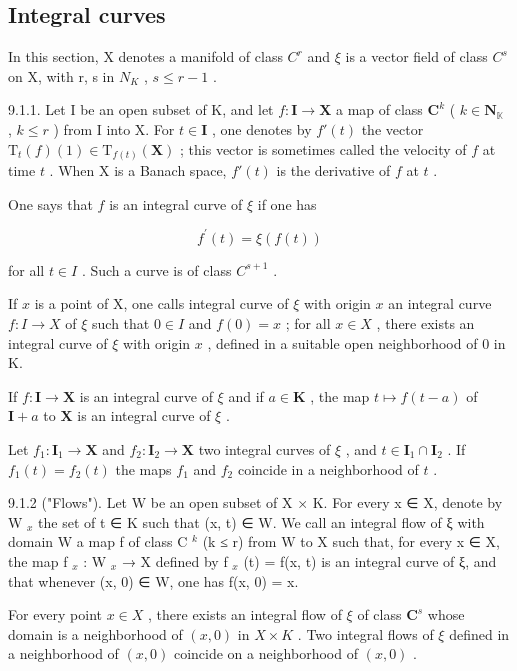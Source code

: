 \subsection{Integral curves}

In this section, X denotes a manifold of class \(C^{r}\) and \(\xi\) is a vector field of class \(C^{s}\) on X, with r, s in \(N_{K}\) , \(s \leqslant r - 1\) .

9.1.1. Let I be an open subset of K, and let \(f: \mathbf{I} \to \mathbf{X}\) a map of class \(\mathbf{C}^k\) ( \(k \in \mathbf{N}_{\mathbb{K}}\) , \(k \leqslant r\) ) from I into X. For \(t \in \mathbf{I}\) , one denotes by \(f'(t)\) the vector \(\mathrm{T}_t(f)(1) \in \mathrm{T}_{f(t)}(\mathbf{X})\) ; this vector is sometimes called the velocity of \(f\) at time \(t\) . When X is a Banach space, \(f'(t)\) is the derivative of \(f\) at \(t\) .

One says that \(f\) is an integral curve of \(\xi\) if one has

\[
f ^ {\prime} (t) = \xi (f (t))\tag{1}
\]

for all \(t \in I\) . Such a curve is of class \(C^{s+1}\) .

If \(x\) is a point of X, one calls integral curve of \(\xi\) with origin \(x\) an integral curve \(f: I \to X\) of \(\xi\) such that \(0 \in I\) and \(f(0) = x\) ; for all \(x \in X\) , there exists an integral curve of \(\xi\) with origin \(x\) , defined in a suitable open neighborhood of 0 in K.

If \(f: \mathbf{I} \to \mathbf{X}\) is an integral curve of \(\xi\) and if \(a \in \mathbf{K}\) , the map \(t \mapsto f(t - a)\) of \(\mathbf{I} + a\) to \(\mathbf{X}\) is an integral curve of \(\xi\) .

Let \(f_{1}\colon\mathbf{I}_{1}\to\mathbf{X}\) and \(f_{2}\colon\mathbf{I}_{2}\to\mathbf{X}\) two integral curves of \(\xi\) , and \(t\in\mathbf{I}_{1}\cap\mathbf{I}_{2}\) . If \(f_{1}(t)=f_{2}(t)\) the maps \(f_{1}\) and \(f_{2}\) coincide in a neighborhood of \(t\) .

9.1.2 ("Flows"). Let W be an open subset of X × K. For every x ∈ X, denote by W \(_{x}\) the set of t ∈ K such that (x, t) ∈ W. We call an integral flow of ξ with domain W a map f of class C \(^{k}\) (k ≤ r) from W to X such that, for every x ∈ X, the map f \(_{x}\) : W \(_{x}\) → X defined by f \(_{x}\) (t) = f(x, t) is an integral curve of ξ, and that whenever (x, 0) ∈ W, one has f(x, 0) = x.

For every point \(x \in X\) , there exists an integral flow of \(\xi\) of class \(\mathbf{C}^s\) whose domain is a neighborhood of \((x, 0)\) in \(X \times K\) . Two integral flows of \(\xi\) defined in a neighborhood of \((x, 0)\) coincide on a neighborhood of \((x, 0)\) .

